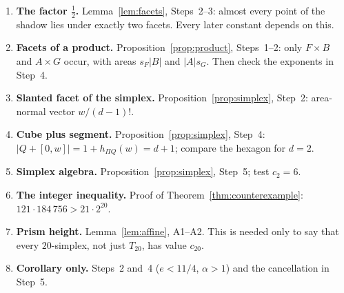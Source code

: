 \documentclass[11pt]{article}
\begin{document}
\begin{enumerate}
\item \textbf{The factor \(\tfrac12\).} Lemma~\ref{lem:facets}, Steps~2--3: almost every point of the shadow lies under exactly two facets. Every later constant depends on this.
\item \textbf{Facets of a product.} Proposition~\ref{prop:product}, Steps~1--2: only \(F\times B\) and \(A\times G\) occur, with areas \(s_F|B|\) and \(|A|s_G\). Then check the exponents in Step~4.
\item \textbf{Slanted facet of the simplex.} Proposition~\ref{prop:simplex}, Step~2: area-normal vector \(w/(d-1)!\).
\item \textbf{Cube plus segment.} Proposition~\ref{prop:simplex}, Step~4: \(|Q+[0,w]|=1+h_{\Pi Q}(w)=d+1\); compare the hexagon for \(d=2\).
\item \textbf{Simplex algebra.} Proposition~\ref{prop:simplex}, Step~5; test \(c_2=6\).
\item \textbf{The integer inequality.} Proof of Theorem~\ref{thm:counterexample}: \(121\cdot184\,756>21\cdot2^{20}\).
\item \textbf{Prism height.} Lemma~\ref{lem:affine}, A1--A2. This is needed only to say that every \(20\)-simplex, not just \(T_{20}\), has value \(c_{20}\).
\item \textbf{Corollary only.} Steps~2 and~4 (\(e<11/4\), \(\alpha>1\)) and the cancellation in Step~5.
\end{enumerate}
\end{document}
